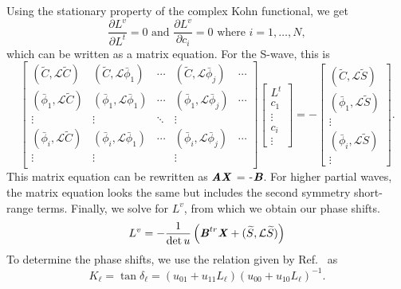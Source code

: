 \documentclass[reprint,showpacs,preprintnumbers,amsmath,amssymb,pra,aps]{revtex4-1}
\newcommand{\beq}{\begin{equation}}
\newcommand{\eeq}{\end{equation}}
\begin{document}
Using the stationary property of the complex Kohn functional, we get
\beq
\frac{\partial L^v}{\partial L^t} = 0  \text{ and } \frac{\partial L^v}{\partial c_i} = 0 \text{ where $i = 1,\ldots,N$},
\label{eq:ComplexKohnStationary}
\eeq
which can be written as a matrix equation. For the S-wave, this is
\begin{equation}
\label{eq:ComplexKohnMatrix}
\begin{bmatrix} 
 (\widetilde{C},\mathcal{L}\widetilde{C}) & (\widetilde{C},\mathcal{L}\bar{\phi}_1) & \cdots & (\widetilde{C},\mathcal{L}\bar{\phi}_j) & \cdots\\
 (\bar{\phi}_1,\mathcal{L}\widetilde{C}) & (\bar{\phi}_1,\mathcal{L}\bar{\phi}_1) & \cdots & (\bar{\phi}_1,\mathcal{L}\bar{\phi}_j) & \cdots\\
 \vdots & \vdots & \ddots & \vdots \\
 (\bar{\phi}_i,\mathcal{L}\widetilde{C}) & (\bar{\phi}_i,\mathcal{L}\bar{\phi}_1) & \cdots & (\bar{\phi}_i,\mathcal{L}\bar{\phi}_j) & \cdots\\
 \vdots & \vdots & & \vdots & \\
\end{bmatrix}
\begin{bmatrix}
L^t\\
c_1\\
\vdots\\
c_i\\
\vdots
\end{bmatrix}
= -
\begin{bmatrix}
(\widetilde{C},\mathcal{L}\widetilde{S}) \\
(\bar{\phi}_1,\mathcal{L}\widetilde{S}) \\
\vdots \\
(\bar{\phi}_i,\mathcal{L}\widetilde{S}) \\
\vdots
\end{bmatrix}.
\end{equation}
This matrix equation can be rewritten as $\textbf{\emph{AX}}$ = -$\textbf{\emph{B}}$. For higher partial waves, the matrix equation looks the same but includes the second symmetry short-range terms. Finally, we solve for $L^v$, from which we obtain our phase shifts.
\begin{equation}
L^v = -\frac{1}{\det u} \left( \textbf{\emph{B}}^{tr} \textbf{\emph{X}} + (\widetilde{S},\mathcal{L} \widetilde{S}) \right)
\end{equation}
To determine the phase shifts, we use the relation given by Ref.~\cite{Lucchese1989} as
\begin{equation}
K_\ell = \tan \delta_\ell = (u_{01} + u_{11} L_\ell)(u_{00} + u_{10} L_\ell)^{-1}.
\end{equation}
\end{document}

